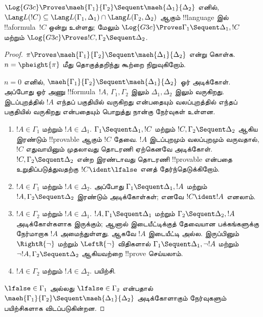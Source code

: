 \documentclass[../../../include/open-logic-section]{subfiles}
\begin{document}
\begin{lem}[மாஎஹாராவின் துணைத்தேற்றம்]
$\Log{G3c} \Proves \maeh{\Gamma_1}{\Gamma_2} \Sequent
\maeh{\Delta_1}{\Delta_2}$ எனில்,
$\Lang L(!C) \subseteq \Lang L(\Gamma_1,
\Delta_1) \cap \Lang L(\Gamma_2, \Delta_2)$ ஆகும்
!!{language} இல் !!a{formula}~$!C$ ஒன்று உள்ளது; மேலும்
$\Log{G3c} \Proves \Gamma_1 \Sequent \Delta_1, !C$
மற்றும் $\Log{G3c} \Proves !C, \Gamma_2 \Sequent \Delta_2$.
\end{lem}

\begin{proof}
  $\pi \Proves \maeh{\Gamma_1}{\Gamma_2} \Sequent
  \maeh{\Delta_1}{\Delta_2}$ என்று கொள்க. $n=\pheight{\pi}$
  மீது தொகுத்தறிந்து கூற்றை நிறுவுகிறோம்.

  $n=0$ எனில், $\maeh{\Gamma_1}{\Gamma_2} \Sequent
  \maeh{\Delta_1}{\Delta_2}$ ஓர் அடிக்கோள். அப்போது ஓர் அணு
  !!{formula}~$!A$, $\Gamma_1, \Gamma_2$ இலும்
  $\Delta_1, \Delta_2$ இலும் வருகிறது. இடப்புறத்தில் $!A$
  எந்தப் பகுதியில் வருகிறது என்பதையும் வலப்புறத்தில் எந்தப் பகுதியில்
  வருகிறது என்பதையும் பொறுத்து நான்கு நேர்வுகள் உள்ளன.
  \begin{enumerate}
    \item $!A \in \Gamma_1$ மற்றும் $!A \in \Delta_1$.
    $\Gamma_1 \Sequent \Delta_1, !C$ மற்றும்
    $!C, \Gamma_2 \Sequent \Delta_2$ ஆகிய இரண்டும்
    !!{provable} ஆகும் $!C$ தேவை. $!A$ இடப்புறமும் வலப்புறமும்
    வருவதால், $!C$ எதுவாயினும் முதலாவது தொடரணி ஏற்கெனவே
    அடிக்கோள். $!C, \Gamma_2 \Sequent \Delta_2$ என்ற
    இரண்டாவது தொடரணி !!{provable} என்பதை உறுதிப்படுத்துவதற்கு
    $!C \ident \lfalse$ எனத் தேர்ந்தெடுக்கிறோம்.
    \item $!A \in \Gamma_1$ மற்றும் $!A \in \Delta_2$.
    அப்போது $\Gamma_1 \Sequent \Delta_1, !A$ மற்றும்
    $!A, \Gamma_2 \Sequent \Delta_2$ இரண்டும் அடிக்கோள்கள்;
    எனவே $!C \ident !A$ எனலாம்.
    \item $!A \in \Gamma_2$ மற்றும் $!A \in \Delta_1$.
    $!A, \Gamma_1 \Sequent \Delta_1$ மற்றும்
    $\Gamma_2 \Sequent \Delta_2, !A$ அடிக்கோள்களாக
    இருக்கும்; ஆனால் இடையீட்டிக்குத் தேவையான பக்கங்களுக்கு
    நேர்மாறாக $!A$ அமைந்துள்ளது. ஆகவே $!A$ இடையீட்டி அல்ல.
    இருப்பினும் $\RightR{\lnot}$ மற்றும் $\LeftR{\lnot}$
    விதிகளால் $\Gamma_1 \Sequent \Delta_1, \lnot!A$
    மற்றும் $\lnot !A, \Gamma_2 \Sequent \Delta_2$
    ஆகியவற்றை !!{prove} செய்யலாம்.
    \item $!A \in \Gamma_2$ மற்றும் $!A \in \Delta_2$.
    பயிற்சி.
  \end{enumerate}
  $\lfalse \in \Gamma_1$ அல்லது $\lfalse \in \Gamma_2$
  என்பதால் $\maeh{\Gamma_1}{\Gamma_2} \Sequent
  \maeh{\Delta_1}{\Delta_2}$ அடிக்கோளாகும் நேர்வுகளும்
  பயிற்சிகளாக விடப்படுகின்றன.


\end{proof}
\end{document}
